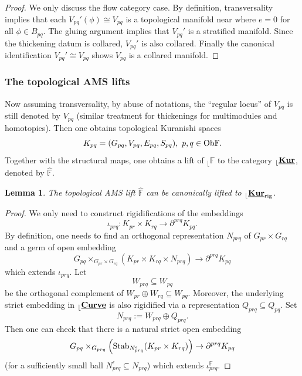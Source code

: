 \documentclass[reqno, 10pt]{amsart}
\numberwithin{equation}{section}
\numberwithin{equation}{section}
\renewcommand{\subset}{\subseteq}
\newtheorem{lemma}[thm]{Lemma}
\theoremstyle{definition}
\theoremstyle{remark}
\newcommand{\beqn}{\begin{equation*}}
\newcommand{\eeqn}{\end{equation*}}
\newcommand{\mb}{\mathbb}
\renewcommand{\outer}{{}_{\lfloor}}
\newcommand{\uds}[1]{\underline{\smash{#1}}}
\begin{document}
\begin{proof}
We only discuss the flow category case. By definition, transversality implies that each $V_{pq}'(\phi) \cong V_{pq}$ is a topological manifold near where $e = 0$ for all $\phi \in B_{pq}$. The gluing argument implies that $V_{pq}'$ is a stratified manifold. Since the thickening datum is collared, $V_{pq}'$ is also collared. Finally the canonical identification $V_{pq}' \cong V_{pq}$ shows $V_{pq}$ is a collared manifold.
\end{proof}



\subsubsection{The topological AMS lifts}\label{subsubsec:top-AMS}

Now assuming transversality, by abuse of notations, the ``regular locus'' of $V_{pq}$ is still denoted by $V_{pq}$ (similar treatment for thickenings for multimodules and homotopies). Then one obtains topological Kuranishi spaces
\beqn
K_{pq} = (G_{pq}, V_{pq}, E_{pq}, S_{pq}),\ p, q \in {\rm Ob}{\mb F}.
\eeqn
Together with the structural maps, one obtains a lift of $\outer {\mb F}$ to the category $\outer \uds{\bf Kur}$, denoted by $\hat {\mb F}$. 

\begin{lemma}\label{lemma_Kuranishi_rigidification}
The topological AMS lift $\hat{\mb F}$ can be canonically lifted to $\outer \uds{\bf Kur}_{\rm rig}$.
\end{lemma}

\begin{proof}
We only need to construct rigidifications of the embeddings
\beqn
\iota_{prq} : K_{pr} \times K_{rq} \to \partial^{prq} K_{pq}.
\eeqn
By definition, one needs to find an orthogonal representation $N_{prq}$ of $G_{pr}\times G_{rq}$ and a germ of open embedding
\beqn
G_{pq}\times_{G_{pr}\times G_{rq}} ( K_{pr} \times K_{rq} \times N_{prq}) \to \partial^{prq} K_{pq}
\eeqn
which extends $\iota_{prq}$. Let
\beqn
W_{prq} \subset W_{pq}
\eeqn
be the orthogonal complement of $W_{pr} \oplus W_{rq} \subset W_{pq}$. Moreover, the underlying strict embedding in $\outer \uds{\bf Curve}$ is also rigidified via a representation $Q_{prq} \subset Q_{pq}$. Set
\beqn
N_{prq}:= W_{prq} \oplus Q_{prq}.
\eeqn
Then one can check that there is a natural strict open embedding
\beqn
G_{pq} \times_{G_{prq}} \left( {\rm Stab}_{N_{prq}^\epsilon} ( K_{pr} \times K_{rq}) \right) \to \partial^{prq} K_{pq}
\eeqn
(for a sufficiently small ball $N_{prq}^\epsilon \subset N_{prq}$) which extends $\iota_{prq}^{\mb F}$.
\end{proof}
\end{document}
